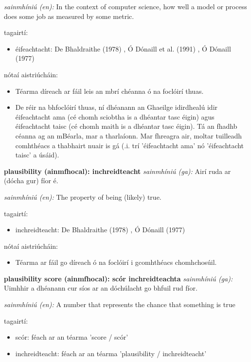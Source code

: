 \documentclass{article}
\begin{document}
\textit{sainmhíniú (en):} In the context of computer science, how well a model or process does some job as measured by some metric.

tagairtí:
\begin{itemize}
	\item éifeachtacht: De Bhaldraithe (1978) \cite{de-bhaldraithe}, Ó Dónaill et al. (1991) \cite{focloir-beag}, Ó Dónaill (1977) \cite{odonaill}
\end{itemize}

nótaí aistriúcháin:
\begin{itemize}
	\item Téarma díreach ar fáil leis an mbrí chéanna ó na foclóirí thuas.
	\item De réir na bhfoclóirí thuas, ní dhéanann an Ghaeilge idirdhealú idir éifeachtacht ama (cé chomh sciobtha is a dhéantar tasc éigin) agus éifeachtacht taisc (cé chomh maith is a dhéantar tasc éigin). Tá an fhadhb céanna ag an mBéarla, mar a tharlaíonn. Mar fhreagra air, moltar tuilleadh comhthéacs a thabhairt nuair is gá (.i. trí 'éifeachtacht ama' nó 'éifeachtacht taisc' a úsáid).
\end{itemize}


\textbf{plausibility (ainmfhocal): inchreidteacht}
\textit{sainmhíniú (ga):} Airí ruda ar (dócha gur) fíor é.

\textit{sainmhíniú (en):} The property of being (likely) true.

tagairtí:
\begin{itemize}
	\item inchreidteacht: De Bhaldraithe (1978) \cite{de-bhaldraithe}, Ó Dónaill (1977) \cite{odonaill}
\end{itemize}

nótaí aistriúcháin:
\begin{itemize}
	\item Téarma ar fáil go díreach ó na foclóirí i gcomhthéacs chomhchosúil.
\end{itemize}


\textbf{plausibility score (ainmfhocal): scór inchreidteachta}
\textit{sainmhíniú (ga):} Uimhhir a dhéanann cur síos ar an dóchúlacht go bhfuil rud fíor.

\textit{sainmhíniú (en):} A number that represents the chance that something is true

tagairtí:
\begin{itemize}
	\item scór: féach ar an téarma 'score / scór'
	\item inchreidteacht: féach ar an téarma 'plausibility / inchreidteacht'
\end{itemize}
\end{document}
